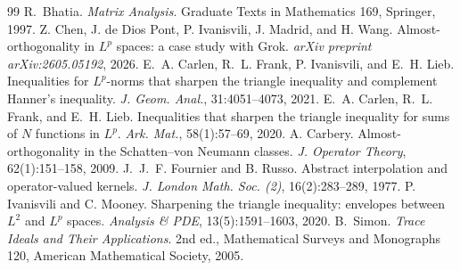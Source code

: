 \documentclass[10pt,a4paper]{amsart}
\newcommand{\1}{\mathbf{1}}
\begin{document}
\begin{thebibliography}{99}
 R.~Bhatia. \newblock \emph{Matrix Analysis}. \newblock Graduate Texts in Mathematics 169, Springer, 1997.
 Z. Chen, J. de Dios Pont, P. Ivanisvili, J. Madrid, and H. Wang. \newblock Almost-orthogonality in $L^p$ spaces: a case study with Grok. \newblock \emph{arXiv preprint arXiv:2605.05192}, 2026.
 E.~A. Carlen, R.~L. Frank, P. Ivanisvili, and E.~H. Lieb. \newblock Inequalities for $L^p$-norms that sharpen the triangle inequality and complement Hanner's inequality. \newblock \emph{J. Geom. Anal.}, 31:4051--4073, 2021.
 E.~A. Carlen, R.~L. Frank, and E.~H. Lieb. \newblock Inequalities that sharpen the triangle inequality for sums of $N$ functions in $L^p$. \newblock \emph{Ark. Mat.}, 58(1):57--69, 2020.
 A. Carbery. \newblock Almost-orthogonality in the Schatten--von Neumann classes. \newblock \emph{J. Operator Theory}, 62(1):151--158, 2009.
 J.~J.~F. Fournier and B. Russo. \newblock Abstract interpolation and operator-valued kernels. \newblock \emph{J. London Math. Soc. (2)}, 16(2):283--289, 1977.
 P. Ivanisvili and C. Mooney. \newblock Sharpening the triangle inequality: envelopes between $L^2$ and $L^p$ spaces. \newblock \emph{Analysis \& PDE}, 13(5):1591--1603, 2020.
 B.~Simon. \newblock \emph{Trace Ideals and Their Applications}. \newblock 2nd ed., Mathematical Surveys and Monographs 120, American Mathematical Society, 2005.
\end{thebibliography}
\end{document}
